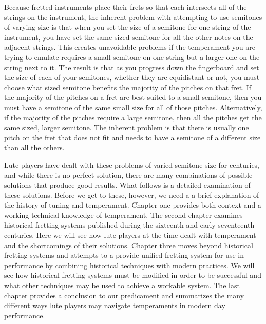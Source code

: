Because fretted instruments place their frets so that each intersects all of the
strings on the instrument, the inherent problem with attempting to use semitones of
varying size is that when you set the size of a semitone for one string of the
instrument, you have set the same sized semitone for all the other notes on the
adjacent strings. This creates unavoidable problems if the temperament you are trying
to emulate requires a small semitone on one string but a larger one
on the string next to it. The result is that as you progress down the fingerboard and
set the size of each of your semitones, whether they are equidistant or not, you must
choose what sized semitone benefits the majority of the pitches on that fret. If the
majority of the pitches on a fret are best suited to a small semitone, then you must
have a semitone of the same small size for all of those pitches. Alternatively, if the
majority of the pitches require a large semitone, then all the pitches get the same
sized, larger semitone.  The inherent problem is that there is usually one pitch on the
fret that does not fit and needs to have a semitone of a different size than
all the others.

Lute players have dealt with these problems of varied semitone size for centuries, and
while there is no perfect solution, there are many combinations of
possible solutions that produce good results. What follows is a detailed examination
of these solutions.  Before we get to these, however, we need a a brief
explanation of the history of tuning and temperament. Chapter one provides both
context and a working technical knowledge of temperament. The second chapter
examines historical fretting systems published during the sixteenth and early
seventeenth centuries. Here we will see how lute players at the time dealt with
temperament and the shortcomings of their solutions. Chapter three moves beyond
historical fretting systems and attempts to a provide unified fretting system for use
in performance by combining historical techniques with modern practices.  We will see
how historical fretting systems must be modified in order to be successful and what
other techniques may be used to achieve a workable system. The last chapter provides a
conclusion to our predicament and summarizes the many different ways lute players
may navigate temperaments in modern day performance.
